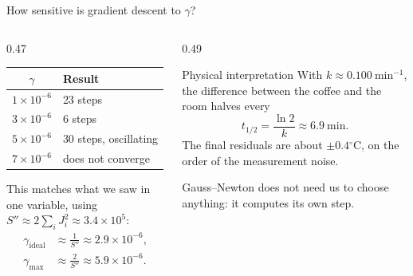 \documentclass[aspectratio=169,10pt]{beamer}
\newcommand{\grados}{\ensuremath{^\circ}}
\begin{document}
\begin{frame}{How sensitive is gradient descent to $\gamma$?}
  \begin{columns}[T]
    \begin{column}{0.47\textwidth}
      \centering
      \begin{tabular}{cl}
        \toprule
        $\gamma$ & Result \\
        \midrule
        $1\times10^{-6}$ & 23 steps \\
        $3\times10^{-6}$ & 6 steps \\
        $5\times10^{-6}$ & 30 steps, oscillating \\
        $7\times10^{-6}$ & does not converge \\
        \bottomrule
      \end{tabular}
      \medskip

      \raggedright
      This matches what we saw in one variable, using $S''\approx 2\sum_i J_i^2 \approx 3.4\times10^{5}$:
      \begin{align*}
        \gamma_{\text{ideal}} &\approx \frac{1}{S''} \approx 2.9\times10^{-6}, \\[2pt]
        \gamma_{\text{max}}   &\approx \frac{2}{S''} \approx 5.9\times10^{-6}.
      \end{align*}
    \end{column}
    \begin{column}{0.49\textwidth}
      \begin{block}{Physical interpretation}
        With $k \approx 0.100\ \text{min}^{-1}$, the difference between the coffee and the room halves every
        \[ t_{1/2} = \frac{\ln 2}{k} \approx 6.9\ \text{min}. \]
        The final residuals are about $\pm 0.4\grados$C, on the order of the measurement noise.
      \end{block}
      Gauss--Newton does not need us to choose anything: it computes its own step.
    \end{column}
  \end{columns}
\end{frame}
\end{document}
